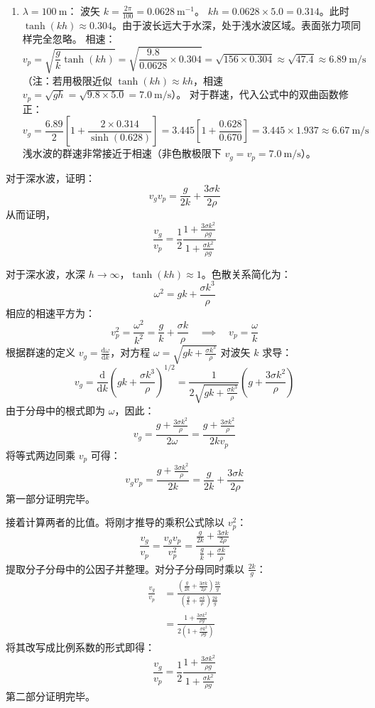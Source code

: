 \begin{solution}
\begin{enumerate}
    \item[(c)] \textbf{$\lambda = 100 \ \mathrm{m}$}：
    波矢 $k = \frac{2\pi}{100} = 0.0628 \ \mathrm{m^{-1}}$。
    $kh = 0.0628 \times 5.0 = 0.314$。此时 $\tanh(kh) \approx 0.304$。由于波长远大于水深，处于浅水波区域。表面张力项同样完全忽略。
    相速：
    $$ v_p = \sqrt{ \frac{g}{k} \tanh(kh) } = \sqrt{\frac{9.8}{0.0628} \times 0.304} = \sqrt{156 \times 0.304} \approx \sqrt{47.4} \approx 6.89 \ \mathrm{m/s} $$
    （注：若用极限近似 $\tanh(kh) \approx kh$，相速 $v_p = \sqrt{gh} = \sqrt{9.8 \times 5.0} = 7.0 \ \mathrm{m/s}$）。
    对于群速，代入公式中的双曲函数修正：
    $$ v_g = \frac{6.89}{2} \left[ 1 + \frac{2 \times 0.314}{\sinh(0.628)} \right] = 3.445 \left[ 1 + \frac{0.628}{0.670} \right] = 3.445 \times 1.937 \approx 6.67 \ \mathrm{m/s} $$
    浅水波的群速非常接近于相速（非色散极限下 $v_g = v_p = 7.0 \ \mathrm{m/s}$）。
\end{enumerate}
\end{solution}

\begin{exercise}\label{ex:8.11}
对于深水波，证明：
$$v_g v_p = \frac{g}{2k} + \frac{3\sigma k}{2\rho}$$
从而证明，
$$\frac{v_g}{v_p} = \frac{1}{2} \frac{1 + \frac{3\sigma k^2}{\rho g}}{1 + \frac{\sigma k^2}{\rho g}}$$
\end{exercise}
\begin{solution}
对于深水波，水深 $h \to \infty$，$\tanh(kh) \approx 1$。色散关系简化为：
$$ \omega^2 = gk + \frac{\sigma k^3}{\rho} $$
相应的相速平方为：
$$ v_p^2 = \frac{\omega^2}{k^2} = \frac{g}{k} + \frac{\sigma k}{\rho} \quad \implies \quad v_p = \frac{\omega}{k} $$
根据群速的定义 $v_g = \frac{\mathrm{d}\omega}{\mathrm{d}k}$，对方程 $\omega = \sqrt{gk + \frac{\sigma k^3}{\rho}}$ 对波矢 $k$ 求导：
$$ v_g = \frac{\mathrm{d}}{\mathrm{d}k} \left( gk + \frac{\sigma k^3}{\rho} \right)^{1/2} = \frac{1}{2\sqrt{gk + \frac{\sigma k^3}{\rho}}} \left( g + \frac{3\sigma k^2}{\rho} \right) $$
由于分母中的根式即为 $\omega$，因此：
$$ v_g = \frac{g + \frac{3\sigma k^2}{\rho}}{2\omega} = \frac{g + \frac{3\sigma k^2}{\rho}}{2 k v_p} $$
将等式两边同乘 $v_p$ 可得：
$$ v_g v_p = \frac{g + \frac{3\sigma k^2}{\rho}}{2k} = \frac{g}{2k} + \frac{3\sigma k}{2\rho} $$
第一部分证明完毕。

接着计算两者的比值。将刚才推导的乘积公式除以 $v_p^2$：
$$ \frac{v_g}{v_p} = \frac{v_g v_p}{v_p^2} = \frac{\frac{g}{2k} + \frac{3\sigma k}{2\rho}}{\frac{g}{k} + \frac{\sigma k}{\rho}} $$
提取分子分母中的公因子并整理。对分子分母同时乘以 $\frac{2k}{g}$：
\[
\begin{aligned}
\frac{v_g}{v_p} &= \frac{\left( \frac{g}{2k} + \frac{3\sigma k}{2\rho} \right) \frac{2k}{g}}{\left( \frac{g}{k} + \frac{\sigma k}{\rho} \right) \frac{2k}{g}}\\
  &= \frac{1 + \frac{3\sigma k^2}{\rho g}}{2 \left( 1 + \frac{\sigma k^2}{\rho g} \right)}
\end{aligned}
\]
将其改写成比例系数的形式即得：
$$ \frac{v_g}{v_p} = \frac{1}{2} \frac{1 + \frac{3\sigma k^2}{\rho g}}{1 + \frac{\sigma k^2}{\rho g}} $$
第二部分证明完毕。
\end{solution}

